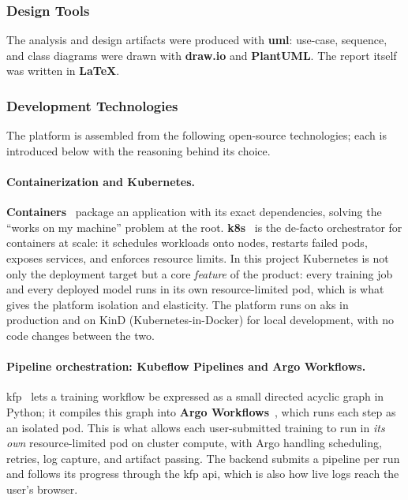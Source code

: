 \subsubsection{Design Tools}
The analysis and design artifacts were produced with \textbf{\gls{uml}}: use-case,
sequence, and class diagrams were drawn with \textbf{draw.io} and
\textbf{PlantUML}. The report itself was written in \textbf{\LaTeX}.

\subsubsection{Development Technologies}
The platform is assembled from the following open-source technologies; each is
introduced below with the reasoning behind its choice.

\paragraph{Containerization and Kubernetes.}
\textbf{Containers}~\cite{docker_docs} package an application with its exact
dependencies, solving the ``works on my machine'' problem at the root.
\textbf{\gls{k8s}}~\cite{kubernetes_docs} is the de-facto orchestrator for
containers at scale: it schedules workloads onto nodes, restarts failed pods,
exposes services, and enforces resource limits. In this project Kubernetes is not
only the deployment target but a core \emph{feature} of the product: every
training job and every deployed model runs in its own resource-limited pod, which
is what gives the platform isolation and elasticity. The platform runs on
\gls{aks} in production and on KinD (Kubernetes-in-Docker) for local development,
with no code changes between the two.


\paragraph{Pipeline orchestration: Kubeflow Pipelines and Argo Workflows.}
\gls{kfp}~\cite{kubeflow_pipelines} lets a training workflow be expressed as a
small directed acyclic graph in Python; it compiles this graph into \textbf{Argo
Workflows}~\cite{argo_workflows}, which runs each step as an isolated pod. This is
what allows each user-submitted training to run in \emph{its own} resource-limited
pod on cluster compute, with Argo handling scheduling, retries, log capture, and
artifact passing. The backend submits a pipeline per run and follows its progress
through the \gls{kfp} \gls{api}, which is also how live logs reach the user's
browser.

